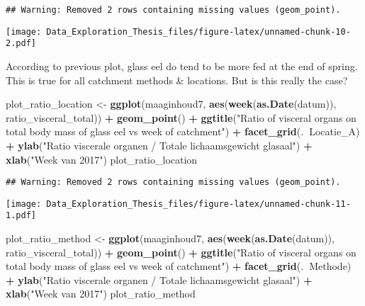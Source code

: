 \documentclass[]{article}
\newenvironment{Shaded}{\begin{snugshade}}{\end{snugshade}}
\newcommand{\KeywordTok}[1]{\textcolor[rgb]{0.13,0.29,0.53}{\textbf{#1}}}
\newcommand{\StringTok}[1]{\textcolor[rgb]{0.31,0.60,0.02}{#1}}
\newcommand{\OperatorTok}[1]{\textcolor[rgb]{0.81,0.36,0.00}{\textbf{#1}}}
\newcommand{\NormalTok}[1]{#1}
\begin{document}
\begin{verbatim}
## Warning: Removed 2 rows containing missing values (geom_point).
\end{verbatim}

\texttt{[image: Data\_Exploration\_Thesis\_files/figure-latex/unnamed-chunk-10-2.pdf]}

According to previous plot, glass eel do tend to be more fed at the end
of spring. This is true for all catchment methods \& locations. But is
this really the case?

\begin{Shaded}
\begin{Highlighting}[]
\NormalTok{plot_ratio_location <-}\StringTok{ }\KeywordTok{ggplot}\NormalTok{(maaginhoud7, }\KeywordTok{aes}\NormalTok{(}\KeywordTok{week}\NormalTok{(}\KeywordTok{as.Date}\NormalTok{(datum)), ratio_visceral_total)) }\OperatorTok{+}
\StringTok{  }\KeywordTok{geom_point}\NormalTok{() }\OperatorTok{+}
\StringTok{  }\KeywordTok{ggtitle}\NormalTok{(}\StringTok{"Ratio of visceral organs on total body mass of glass eel vs week of catchment"}\NormalTok{) }\OperatorTok{+}
\StringTok{  }\KeywordTok{facet_grid}\NormalTok{(.}\OperatorTok{~}\NormalTok{Locatie_A) }\OperatorTok{+}
\StringTok{  }\KeywordTok{ylab}\NormalTok{(}\StringTok{"Ratio viscerale organen / Totale lichaamsgewicht glasaal"}\NormalTok{) }\OperatorTok{+}
\StringTok{  }\KeywordTok{xlab}\NormalTok{(}\StringTok{"Week van 2017"}\NormalTok{)}
\NormalTok{plot_ratio_location}
\end{Highlighting}
\end{Shaded}

\begin{verbatim}
## Warning: Removed 2 rows containing missing values (geom_point).
\end{verbatim}

\texttt{[image: Data\_Exploration\_Thesis\_files/figure-latex/unnamed-chunk-11-1.pdf]}

\begin{Shaded}
\begin{Highlighting}[]
\NormalTok{plot_ratio_method <-}\StringTok{ }\KeywordTok{ggplot}\NormalTok{(maaginhoud7, }\KeywordTok{aes}\NormalTok{(}\KeywordTok{week}\NormalTok{(}\KeywordTok{as.Date}\NormalTok{(datum)), ratio_visceral_total)) }\OperatorTok{+}
\StringTok{  }\KeywordTok{geom_point}\NormalTok{() }\OperatorTok{+}
\StringTok{  }\KeywordTok{ggtitle}\NormalTok{(}\StringTok{"Ratio of visceral organs on total body mass of glass eel vs week of catchment"}\NormalTok{) }\OperatorTok{+}
\StringTok{  }\KeywordTok{facet_grid}\NormalTok{(.}\OperatorTok{~}\NormalTok{Methode) }\OperatorTok{+}
\StringTok{  }\KeywordTok{ylab}\NormalTok{(}\StringTok{"Ratio viscerale organen / Totale lichaamsgewicht glasaal"}\NormalTok{) }\OperatorTok{+}
\StringTok{  }\KeywordTok{xlab}\NormalTok{(}\StringTok{"Week van 2017"}\NormalTok{)}
\NormalTok{plot_ratio_method}
\end{Highlighting}
\end{Shaded}
\end{document}
